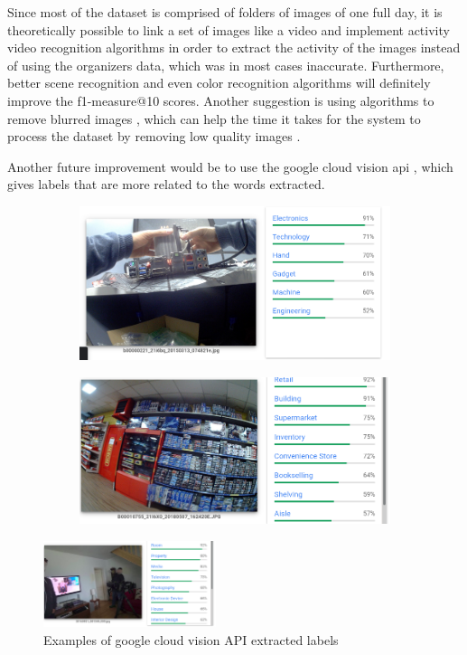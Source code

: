 Since most of the dataset is comprised of folders of images of one full day, it is theoretically possible to link a set of images like a video and implement activity video recognition algorithms in order to extract the activity of the images instead of using the organizers data, which was in most cases inaccurate. Furthermore, better scene recognition and even color recognition algorithms will definitely improve the f1-measure@10 scores. Another suggestion is using algorithms to remove blurred images , which can help the time it takes for the system to process the dataset by removing low quality images .

Another future improvement would be to use the google cloud vision api \cite{google}, which gives labels that are more related to the words extracted. 


\begin{figure}[H]
    \centering
    \captionsetup{justification=centering}
    \begin{subfigure}{0.45\textwidth}
    \includegraphics[width=\textwidth]{Sections/8Conclusion/images/google.png} 
  
    \end{subfigure}
    \begin{subfigure}{0.45\textwidth}
    \includegraphics[width=\textwidth]{Sections/8Conclusion/images/labels.png}
    \end{subfigure}

  \end{figure}


\begin{figure}[H]
    \centering
    \captionsetup{justification=centering}

    \includegraphics[width=0.45\textwidth]{Sections/8Conclusion/images/google_labels_2.png}
    
    \caption{Examples of google cloud vision API extracted labels \cite{google}}
\end{figure}
